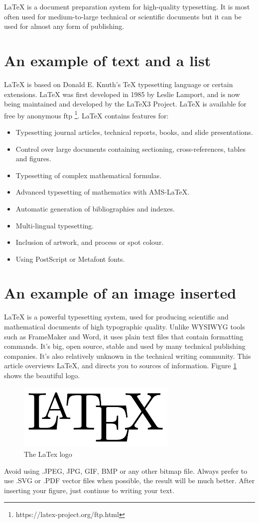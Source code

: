 LaTeX is a document preparation system for high-quality typesetting. It is most often used for medium-to-large technical or scientific documents but it can be used for almost any form of publishing.

\section{An example of text and a list}

LaTeX is based on Donald E. Knuth's TeX typesetting language or certain extensions. LaTeX was first developed in 1985 by Leslie Lamport, and is now being maintained and developed by the LaTeX3 Project. LaTeX is available for free by anonymous ftp \footnote{https://latex-project.org/ftp.html}. LaTeX contains features for:

\begin{itemize}
\item Typesetting journal articles, technical reports, books, and slide presentations.
\item Control over large documents containing sectioning, cross-references, tables and figures.
\item Typesetting of complex mathematical formulas.
\item Advanced typesetting of mathematics with AMS-LaTeX.
\item Automatic generation of bibliographies and indexes.
\item Multi-lingual typesetting.
\item Inclusion of artwork, and process or spot colour.
\item Using PostScript or Metafont fonts.
\end{itemize}

\section{An example of an image inserted}
LaTeX is a powerful typesetting system, used for producing scientific and mathematical documents of high typographic quality. Unlike WYSIWYG tools such as FrameMaker and Word, it uses plain text files that contain formatting
commands. It's big, open source, stable and used by many technical publishing companies. It's also relatively unknown in the technical writing community. This article overviews LaTeX, and directs you to sources of information. Figure \ref{figure:latex-logo} shows the beautiful  logo.

\begin{figure}[htbp]
\begin{center}
\includegraphics[width=3in]{figures/LaTeX_logo}
\caption{The LaTex logo}
\label{figure:latex-logo}
\end{center}
\end{figure}

Avoid using .JPEG, JPG, GIF, BMP or any other bitmap file. Always prefer to use .SVG or .PDF vector files when possible, the result will be much better. After inserting your figure, just continue to writing your text.